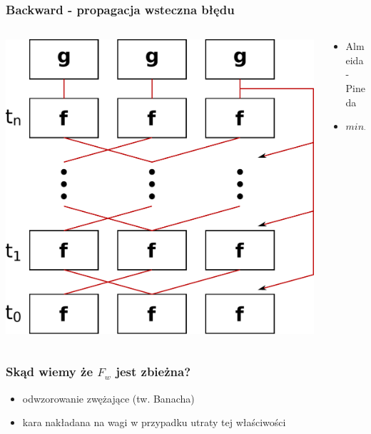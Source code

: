 \documentclass{beamer}
\begin{document}
\begin{frame}
\frametitle{Backward - propagacja wsteczna błędu}
\begin{columns}
	\begin{column}{0.66\textwidth}
		\includegraphics[scale=0.4]{img/backward}
	\end{column}
	\begin{column}{0.34\textwidth}
		\begin{itemize}
			\item Almeida-Pineda
			\item $minErrorDiff$
		\end{itemize}
	\end{column}
\end{columns}
\end{frame}

\begin{frame}
\frametitle{Skąd wiemy że $F_w$ jest zbieżna?}
\begin{itemize}
	\item odwzorowanie zwężające (tw. Banacha)
	\item kara nakładana na wagi w przypadku utraty tej właściwości
\end{itemize}
\end{frame}
\end{document}
